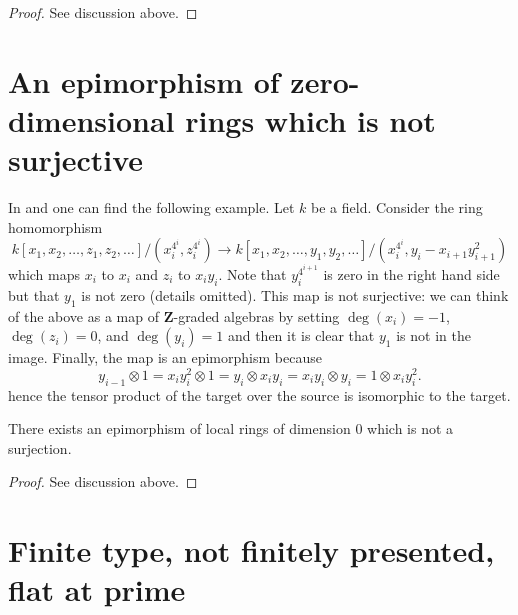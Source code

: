 \begin{proof}
See discussion above.
\end{proof}








\section{An epimorphism of zero-dimensional rings which is not surjective}
\label{section-epimorphism-not-surjective}

\noindent
In \cite{Lazard-deux} and \cite{Autour} one can find the following example.
Let $k$ be a field. Consider the ring homomorphism
$$
k[x_1, x_2, \ldots, z_1, z_2, \ldots]/
(x_i^{4^i}, z_i^{4^i})
\longrightarrow
k[x_1, x_2, \ldots, y_1, y_2, \ldots]/
(x_i^{4^i}, y_i - x_{i + 1}y_{i + 1}^2)
$$
which maps $x_i$ to $x_i$ and $z_i$ to $x_iy_i$. Note that $y_i^{4^{i + 1}}$
is zero in the right hand side but that $y_1$ is not zero (details omitted).
This map is not surjective: we can think of the above as a map of
$\mathbf{Z}$-graded algebras by setting $\deg(x_i) = -1$, $\deg(z_i) = 0$,
and $\deg(y_i) = 1$ and then it is clear that $y_1$ is not in the image.
Finally, the map is an epimorphism because
$$
y_{i - 1} \otimes 1 = x_i y_i^2 \otimes 1 = y_i \otimes x_i y_i =
x_i y_i \otimes y_i = 1 \otimes x_i y_i^2.
$$
hence the tensor product of the target over the source is isomorphic
to the target.

\begin{lemma}
\label{lemma-epi-not-surjective}
There exists an epimorphism of local rings of dimension $0$
which is not a surjection.
\end{lemma}

\begin{proof}
See discussion above.
\end{proof}



\section{Finite type, not finitely presented, flat at prime}
\label{section-ft-not-fp-flat-at-prime}

